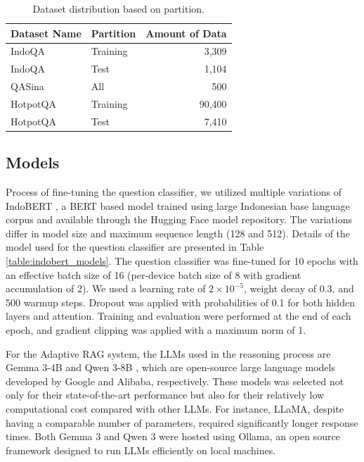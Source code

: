 \documentclass[times]{iapress}
\begin{document}
\begin{table}[h!]
\caption{Dataset distribution based on partition.}
\label{table:dataset_info}
\centering
\begin{tabular}{|l|l|r|}
\hline
\textbf{Dataset Name} & \textbf{Partition} & \textbf{Amount of Data} \\
\hline
IndoQA & Training & 3,309 \\
IndoQA & Test     & 1,104 \\
QASina & All      & 500  \\
HotpotQA & Training     & 90,400\\
HotpotQA & Test     & 7,410 \\
\hline
\end{tabular}
\label{tab:dataset_distribution}
\end{table}




\subsection{Models}

Process of fine-tuning the question classifier, we utilized multiple variations of IndoBERT \cite{indobert}, a BERT based model trained using large Indonesian base language corpus and available through the Hugging Face model repository. The variations differ in model size and maximum sequence length (128 and 512). Details of the model used for the question classifier are presented in Table \ref{table:indobert_models}. The question classifier was fine-tuned for 10 epochs with an effective batch size of 16 (per-device batch size of 8 with gradient accumulation of 2). We used a learning rate of $2 \times 10^{-5}$, weight decay of 0.3, and 500 warmup steps. Dropout was applied with probabilities of 0.1 for both hidden layers and attention. Training and evaluation were performed at the end of each epoch, and gradient clipping was applied with a maximum norm of 1.

For the Adaptive RAG system, the LLMs used in the reasoning process are Gemma 3-4B \cite{gemma} and Qwen 3-8B \cite{qwen}, which are open-source large language models developed by Google and Alibaba, respectively. These models was selected not only for their state-of-the-art performance but also for their relatively low computational cost compared with other LLMs. For instance, LLaMA, despite having a comparable number of parameters, required significantly longer response times. Both Gemma 3 and Qwen 3 were hosted using Ollama, an open source framework designed to run LLMs efficiently on local machines.
\end{document}
